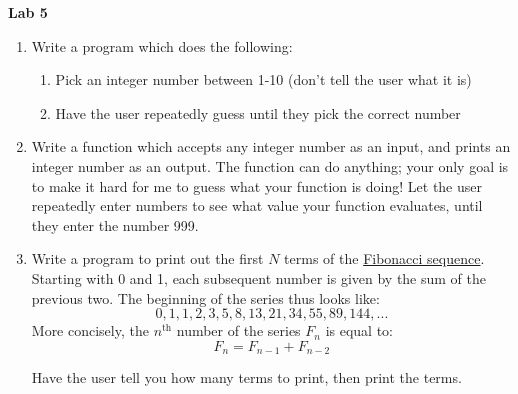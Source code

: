 \documentclass{article}
\begin{document}
\fancyfoot[C]{\thepage}
\vspace*{0cm}
\begin{center}
	{\LARGE \textbf{Lab 5}}\\
	\vspace{.25cm}
\end{center}

\begin{enumerate}
	\item Write a program which does the following:
	\begin{enumerate}
		\item Pick an integer number between 1-10 (don't tell the user what it is)
		\item Have the user repeatedly guess until they pick the correct number
	\end{enumerate}
	\item Write a function which accepts any integer number as an input, and prints an integer number as an output. The function can do anything; your only goal is to make it hard for me to guess what your function is doing! Let the user repeatedly enter numbers to see what value your function evaluates, until they enter the number 999.
	\item Write a program to print out the first $N$ terms of the \href{https://en.wikipedia.org/wiki/Fibonacci_number}{Fibonacci sequence}. Starting with 0 and 1, each subsequent number is given by the sum of the previous two. The beginning of the series thus looks like:
	\begin{equation*}
	0, 1, 1, 2, 3, 5, 8, 13, 21, 34, 55, 89, 144, ...
	\end{equation*}
	More concisely, the $n^\mathrm{th}$ number of the series $F_n$ is equal to:
	\begin{equation*}
	F_n = F_{n-1} + F_{n-2}
	\end{equation*}
	
	Have the user tell you how many terms to print, then print the terms.
\end{enumerate}
\end{document}

